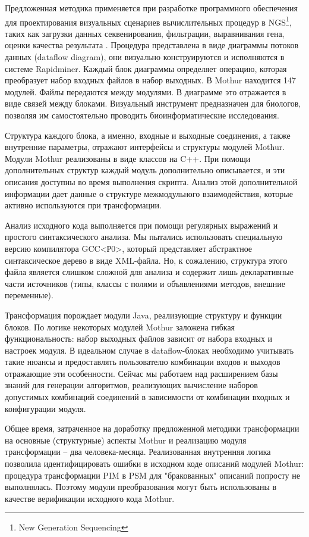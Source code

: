 \documentclass[conference]{IEEEtran} \IEEEoverridecommandlockouts
\begin{document}
Предложенная методика применяется при разработке программного обеспечения для проектирования визуальных сценариев вычислительных процедур в NGS\footnote{New Generation Sequencing}, таких как загрузки данных секвенирования, фильтрации, выравнивания гена, оценки качества результата \cite{bit2019}. Процедура представлена в виде диаграммы потоков данных (dataflow diagram), они визуально конструируются и исполняются в системе Rapidminer. Каждый блок диаграммы определяет операцию, которая преобразует набор входных файлов в набор выходных.  В Mothur находится 147 модулей. Файлы передаются между модулями. В диаграмме это отражается в виде связей между блоками. Визуальный инструмент предназначен для биологов, позволяя им самостоятельно проводить биоинформатические исследования. 

Структура каждого блока, а именно, входные и выходные соединения, а также внутренние параметры, отражают интерфейсы и структуры модулей Mothur. Модули Mothur реализованы в виде классов на C++.  При помощи дополнительных структур каждый модуль дополнительно описывается, и эти описания доступны во время выполнения скрипта. Анализ этой дополнительной информации дает данные о структуре межмодульного взаимодействия, которые активно используются при трансформации. 

Анализ исходного кода выполняется при помощи регулярных выражений и простого синтаксического анализа. Мы пытались использовать специальную версию компилятора GCC<Р0>, который представляет абстрактное синтаксическое дерево в виде XML-файла. Но, к сожалению, структура этого файла является слишком сложной для анализа и содержит лишь декларативные части источников (типы, классы с полями и объявлениями методов, внешние переменные). 

Трансформация порождает модули Java, реализующие структуру и функции блоков. По логике некоторых модулей Mothur заложена гибкая функциональность: набор выходных файлов зависит от набора входных и настроек модуля.  В идеальном случае в dataflow-блоках необходимо учитывать такие нюансы и предоставлять пользователю комбинации входов и выходов отражающие эти особенности. Сейчас мы работаем над расширением базы знаний для генерации алгоритмов, реализующих вычисление наборов допустимых комбинаций соединений в зависимости от комбинации входных и конфигурации модуля. 

Общее время, затраченное на доработку предложенной методики трансформации на основные (структурные) аспекты Mothur и реализацию модуля трансформации -- два человека-месяца. Реализованная внутренняя логика позволила идентифицировать ошибки в исходном коде описаний модулей Mothur: процедура трансформации PIM в PSM для "бракованных" описаний попросту не выполнялась. Поэтому модули преобразования могут быть использованы в качестве верификации исходного кода Mothur. 
\end{document}
